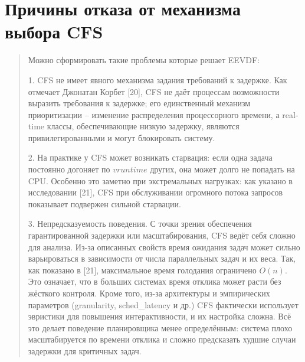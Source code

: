 \documentclass[12pt, oneside]{book}
\begin{document}
\section{Причины отказа от механизма выбора CFS}
\begin{quote}
  Можно сформировать такие проблемы которые решает EEVDF:

  1. CFS не имеет явного механизма задания требований к задержке.
  Как отмечает Джонатан Корбет [20], CFS не даёт процессам возможности выразить
  требования к задержке; его единственный механизм приоритизации -- изменение 
  распределения процессорного времени, а real-time классы, обеспечивающие низкую
  задержку, являются привилегированными и могут блокировать систему.
  
  2. На практике у CFS может возникать старвация: если одна задача
  постоянно догоняет по $ vruntime $ других, она может долго не попадать на CPU.
  Особенно это заметно при экстремальных нагрузках: как указано в исследовании
  [21], CFS при обслуживании огромного потока запросов показывает подвержен
  сильной старвации.

  3. Непредсказуемость поведения. С точки зрения обеспечения гарантированной задержки
  или масштабирования, CFS ведёт себя сложно для анализа. Из-за описанных свойств время
  ожидания задач может сильно варьироваться в зависимости от числа параллельных задач и
  их веса. Так, как показано в [21], максимальное время голодания ограничено $ O(n) $. Это
  означает, что в больших системах время отклика может расти без жёсткого контроля. Кроме
  того, из-за архитектуры и эмпирических параметров (granularity, sched\_latency и др.)
  CFS фактически использует эвристики для повышения интерактивности, и их настройка
  сложна. Всё это делает поведение планировщика менее определённым: система плохо
  масштабируется по времени отклика и сложно предсказать худшие случаи задержки
  для критичных задач.
\end{quote}
\end{document}
